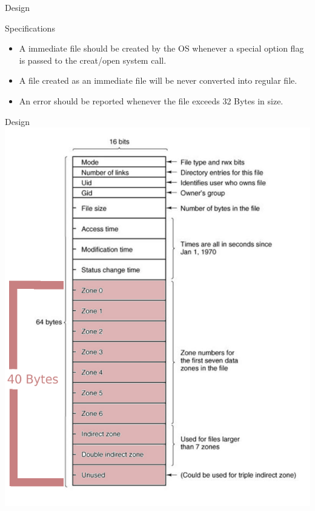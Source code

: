 \documentclass{beamer}
\begin{document}
\begin{frame}{Design}
\begin{Huge}
Specifications
\linebreak
\end{Huge}

\begin{itemize}
\item A immediate file should be created by the OS whenever a special option flag is passed to the creat/open system call.
\item A file created as an immediate file will be never converted into regular file.
\item An error should be reported whenever the file exceeds 32 Bytes in size. 
\end{itemize}
\end{frame}

%
\begin{frame}{Design}
\center \includegraphics[scale=0.33]{inode.jpg} 
\end{frame}
\end{document}
